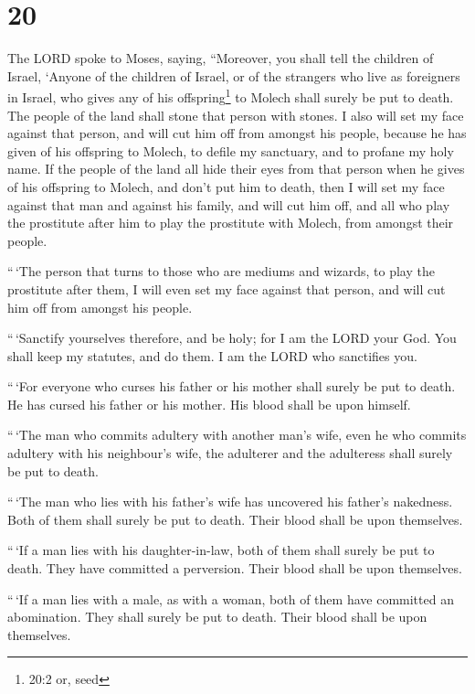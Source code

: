 \hypertarget{section-19}{%
\section{20}\label{section-19}}

 The LORD spoke to Moses, saying,  ``Moreover,
you shall tell the children of Israel, `Anyone of the children of
Israel, or of the strangers who live as foreigners in Israel, who gives
any of his offspring\footnote{20:2 or, seed} to Molech shall surely be
put to death. The people of the land shall stone that person with
stones.  I also will set my face against that person, and
will cut him off from amongst his people, because he has given of his
offspring to Molech, to defile my sanctuary, and to profane my holy
name.  If the people of the land all hide their eyes from
that person when he gives of his offspring to Molech, and don't put him
to death,  then I will set my face against that man and
against his family, and will cut him off, and all who play the
prostitute after him to play the prostitute with Molech, from amongst
their people.

 ``\,`The person that turns to those who are mediums and
wizards, to play the prostitute after them, I will even set my face
against that person, and will cut him off from amongst his people.

 ``\,`Sanctify yourselves therefore, and be holy; for I am
the LORD your God.  You shall keep my statutes, and do them.
I am the LORD who sanctifies you.

 ``\,`For everyone who curses his father or his mother shall
surely be put to death. He has cursed his father or his mother. His
blood shall be upon himself.

 ``\,`The man who commits adultery with another man's wife,
even he who commits adultery with his neighbour's wife, the adulterer
and the adulteress shall surely be put to death.

 ``\,`The man who lies with his father's wife has uncovered
his father's nakedness. Both of them shall surely be put to death. Their
blood shall be upon themselves.

 ``\,`If a man lies with his daughter-in-law, both of them
shall surely be put to death. They have committed a perversion. Their
blood shall be upon themselves.

 ``\,`If a man lies with a male, as with a woman, both of
them have committed an abomination. They shall surely be put to death.
Their blood shall be upon themselves.

